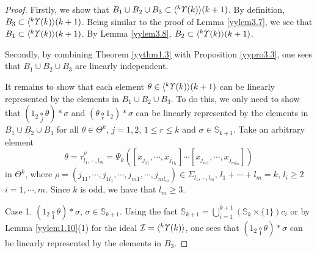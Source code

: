 \documentclass{amsart}
\theoremstyle{definition}
\theoremstyle{remark}
\numberwithin{equation}{section}
\def\S{\mathbb{S}}
\newcommand{\lr}[1]{\langle #1 \rangle}
\newcommand{\ucr}[1]{\underset{#1}{\circ}}
\newcommand{\up}[1]{{^{#1}{\it \!\Upsilon}}}
\def \I{\mathcal{I}}
\def \S{\mathbb{S}}
\begin{document}
\begin{proof} 
Firstly, we show that $B_1\cup B_2\cup B_3\subset 
\lr{\up{k}(k)}(k+1)$. By definition, $B_3\subset 
\lr{\up{k}(k)}(k+1)$. 
Being similar to the proof of Lemma \ref{yylem3.7}, we see
that $B_1\subset \lr{\up{k}(k)}(k+1)$. By Lemma \ref{yylem3.8}, 
$B_2\subset \lr{\up{k}(k)}(k+1)$.
	
Secondly, by combining Theorem \ref{yythm1.3}
with Proposition \ref{yypro3.3}, one sees that 
$B_1\cup B_2\cup B_3$ are linearly independent.

It remains to show that each element $\theta\in \lr{\up{k}(k)}(k+1)$ 
can be linearly represented by the elements in $B_1\cup B_2\cup B_3$.
To do this, we only need to show that 
$(1_2\ucr{j} \theta)\ast\sigma$ and $(\theta\ucr{r} 1_2)\ast\sigma$ 
can be linearly represented by the elements in 
$B_1\cup B_2\cup B_3$ for all $\theta\in \Theta^{k}$, $j=1, 2$, 
$1\le r\le k$ and $\sigma\in \S_{k+1}$. Take an arbitrary element
\[\theta=\tau^\rho_{l_1,\cdots,l_m}
=\Psi_k([x_{j_{11}}, \cdots, x_{j_{1l_1}}]
\cdots[x_{j_{m1}}, \cdots, x_{j_{ml_m}}]) \]
in $\Theta^k$, where $\rho=(j_{11}, \cdots, j_{1l_1}, \cdots, j_{m1}, 
\cdots, j_{ml_m})\in \Sigma_{l_1, \cdots, l_m}$, 
$l_1+\cdots+l_m=k$, $l_i\ge 2$ $i=1, \cdots, m$. Since $k$ is odd, 
we have that $l_m\ge 3$. 

Case 1. $(1_2\ucr{1} \theta)\ast \sigma$, $\sigma\in \S_{k+1}$. 
Using the fact $\S_{k+1}=\bigcup_{i=1}^{k+1} (\S_k\times \{1\}) c_i$ 
or by Lemma \ref{yylem1.10}(1) for the ideal 
$\I=\lr{\up{k}(k)}$, one sees that 
$(1_2\ucr{1} \theta)\ast \sigma$ can be linearly represented 
by the elements in $B_3$.


\end{proof}
\end{document}

